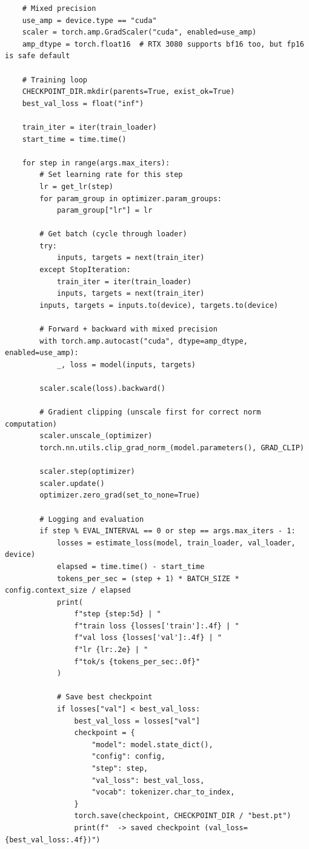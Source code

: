 \begin{lstlisting}
    # Mixed precision
    use_amp = device.type == "cuda"
    scaler = torch.amp.GradScaler("cuda", enabled=use_amp)
    amp_dtype = torch.float16  # RTX 3080 supports bf16 too, but fp16 is safe default

    # Training loop
    CHECKPOINT_DIR.mkdir(parents=True, exist_ok=True)
    best_val_loss = float("inf")

    train_iter = iter(train_loader)
    start_time = time.time()

    for step in range(args.max_iters):
        # Set learning rate for this step
        lr = get_lr(step)
        for param_group in optimizer.param_groups:
            param_group["lr"] = lr

        # Get batch (cycle through loader)
        try:
            inputs, targets = next(train_iter)
        except StopIteration:
            train_iter = iter(train_loader)
            inputs, targets = next(train_iter)
        inputs, targets = inputs.to(device), targets.to(device)

        # Forward + backward with mixed precision
        with torch.amp.autocast("cuda", dtype=amp_dtype, enabled=use_amp):
            _, loss = model(inputs, targets)

        scaler.scale(loss).backward()

        # Gradient clipping (unscale first for correct norm computation)
        scaler.unscale_(optimizer)
        torch.nn.utils.clip_grad_norm_(model.parameters(), GRAD_CLIP)

        scaler.step(optimizer)
        scaler.update()
        optimizer.zero_grad(set_to_none=True)

        # Logging and evaluation
        if step % EVAL_INTERVAL == 0 or step == args.max_iters - 1:
            losses = estimate_loss(model, train_loader, val_loader, device)
            elapsed = time.time() - start_time
            tokens_per_sec = (step + 1) * BATCH_SIZE * config.context_size / elapsed
            print(
                f"step {step:5d} | "
                f"train loss {losses['train']:.4f} | "
                f"val loss {losses['val']:.4f} | "
                f"lr {lr:.2e} | "
                f"tok/s {tokens_per_sec:.0f}"
            )

            # Save best checkpoint
            if losses["val"] < best_val_loss:
                best_val_loss = losses["val"]
                checkpoint = {
                    "model": model.state_dict(),
                    "config": config,
                    "step": step,
                    "val_loss": best_val_loss,
                    "vocab": tokenizer.char_to_index,
                }
                torch.save(checkpoint, CHECKPOINT_DIR / "best.pt")
                print(f"  -> saved checkpoint (val_loss={best_val_loss:.4f})")


\end{lstlisting}
